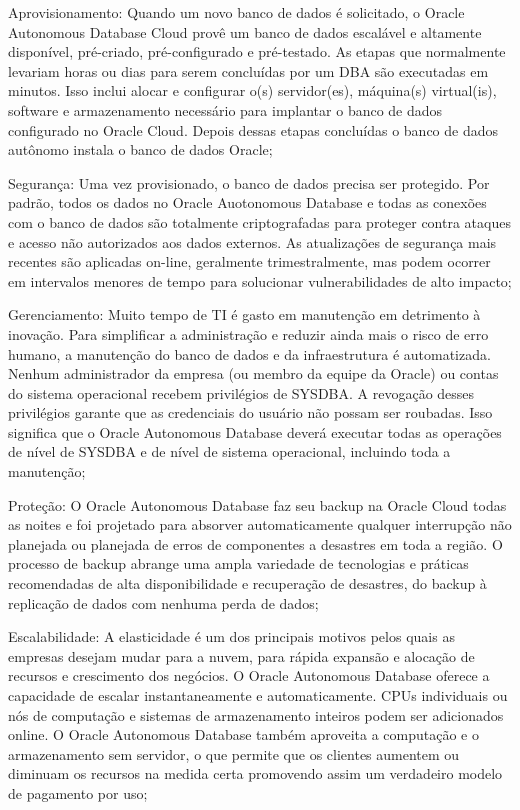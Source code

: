 \begin{alineas}

\item Aprovisionamento: Quando um novo banco de dados é solicitado, o Oracle Autonomous Database Cloud provê um banco de dados escalável e altamente disponível, pré-criado, pré-configurado e pré-testado. As etapas que normalmente levariam horas ou dias para serem concluídas por um DBA são executadas em minutos. Isso inclui alocar e configurar o(s) servidor(es), máquina(s) virtual(is),  software e armazenamento necessário para implantar o banco de dados configurado no Oracle Cloud. Depois dessas etapas concluídas o banco de dados autônomo instala o banco de dados Oracle;

\item Segurança: Uma vez provisionado, o banco de dados precisa ser protegido. Por padrão, todos os dados no Oracle Auotonomous Database e todas as conexões com o banco de dados são totalmente criptografadas para proteger contra ataques e acesso não autorizados aos dados externos. As atualizações de segurança mais recentes são aplicadas on-line, geralmente trimestralmente, mas podem ocorrer em intervalos menores de tempo para solucionar vulnerabilidades de alto impacto;

\item Gerenciamento: Muito tempo de TI é gasto em manutenção em detrimento à inovação. Para simplificar a administração e reduzir ainda mais o risco de erro humano, a manutenção do banco de dados e da infraestrutura é automatizada. Nenhum administrador da empresa (ou membro da equipe da Oracle) ou contas do sistema operacional recebem privilégios de SYSDBA. A revogação desses privilégios garante que as credenciais do usuário não possam ser roubadas. Isso significa que o Oracle Autonomous Database deverá executar todas as operações de nível de SYSDBA e de nível de sistema operacional, incluindo toda a manutenção;

\item Proteção: O Oracle Autonomous Database faz seu backup na Oracle Cloud todas as noites e foi projetado para absorver automaticamente qualquer interrupção não planejada ou planejada de erros de componentes a desastres em toda a região. O processo de backup abrange uma ampla variedade de tecnologias e práticas recomendadas de alta disponibilidade e recuperação de desastres, do backup à replicação de dados com nenhuma perda de dados; 

\item Escalabilidade: A elasticidade é um dos principais motivos pelos quais as empresas desejam mudar para a nuvem, para rápida expansão e alocação de recursos e crescimento dos negócios. O Oracle Autonomous Database oferece a capacidade de escalar instantaneamente e automaticamente. CPUs individuais ou nós de computação e sistemas de armazenamento inteiros podem ser adicionados online. O Oracle Autonomous Database também aproveita a computação e o armazenamento sem servidor, o que permite que os clientes aumentem ou diminuam os recursos na medida certa promovendo assim um verdadeiro modelo de pagamento por uso;


\end{alineas}
